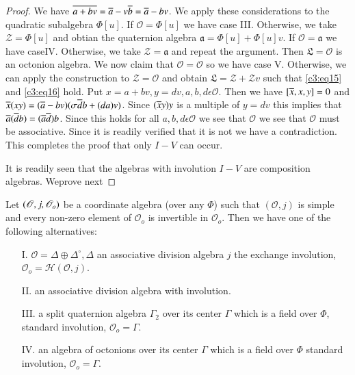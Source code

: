 \begin{proof}
We have $\overline{a+bv}=\overline{a}-v\overline{b}=\overline{a}-bv$. We apply these
considerations to the quadratic subalgebra $\Phi[u]$. If
$\mathscr{O}=\Phi[u]$ we have case III. Otherwise, we take
$\mathscr{Z}=\Phi[u]$ and obtian the quaternion algebra
$\mathfrak{a}=\Phi [u]+\Phi[u]v$. If $\mathscr{O}=\mathfrak{a}$ we
have caseIV. Otherwise, we take $\mathscr{Z}=\mathfrak{a}$ and repeat
the argument. Then $\mathfrak{L}=\mathcal{O}$ is an octonion
algebra. We now claim that $\mathscr{O}=\mathcal{O}$ so we have case
V. Otherwise, we can apply the construction to
$\mathscr{Z}=\mathcal{O}$ and obtain
$\mathfrak{L}=\mathscr{Z}+\mathscr{Z}v$ such that \eqref{c3:eq15} and
\eqref{c3:eq16} 
hold. Put $x=a+bv,y=dv,a,b,d\epsilon \mathcal{O}$. Then we have
$[\overline{x},x,y]=0$ and $\overline{x}(xy)=(\overline{a}-bv)(\sigma
\overline{d}b+(da)v)$. Since $(\overline{x} y)y$ is a multiple of $y=dv$ this
implies that $\overline{a}(\overline{d}b)=(\overline{a}\overline{d})b$. Since this holds for
all $a,b,d\epsilon \mathcal{O}$ we see that $\mathcal{O}$ we see
that $\mathcal{O}$ must be associative. Since it is readily verified
that it is not we have a contradiction. This completes the proof that
only $I-V$ can occur.

It is readily seen that the algebras with involution $I-V$ are
composition algebras.
We\pageoriginale prove next
\end{proof}

\begin{thm}\label{c3:thm9} 
  Let $(\mathscr{O},j,\break\mathscr{O}_o)$ be a coordinate algebra (over any
  $\Phi$) such that $(\mathscr{O},j)$ is simple and every non-zero
  element of $\mathscr{O}_o$ is invertible in $\mathscr{O}_o$. Then we
  have one of the following alternatives:
  \begin{itemize}
  \item[I.] $\mathscr{O}=\Delta \oplus \Delta^{\circ},\Delta$ an
    associative division algebra $j$ the exchange involution,
    $\mathscr{O}_o=\mathscr{H}(\mathscr{O},j)$.
  \item[II.] an associative division algebra with involution.
  \item[III.] a split quaternion algebra $\Gamma_2$ over its center
    $\Gamma $ which is a field over $\Phi$, standard involution,
    $\mathscr{O}_o=\Gamma$. 
  \item[IV.] an algebra of octonions over its center $\Gamma$ which is a
    field over $\Phi$ standard involution, $\mathscr{O}_o=\Gamma$.
  \end{itemize}
\end{thm}

